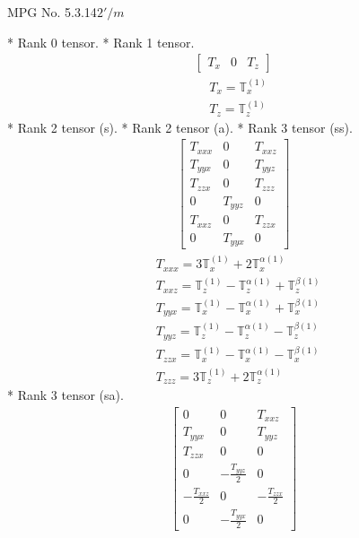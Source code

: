 \documentclass[fleqn,8pt,landscape]{jsarticle}
\begin{document}
\setcounter{MaxMatrixCols}{32}

\renewcommand{\tablename}{Table~}
\renewcommand{\figurename}{Figure~}
\begin{center}
\LARGE
MPG No. 5.3.14\quad$2'/m$
\end{center}
* Rank 0 tensor.
* Rank 1 tensor.
\begin{align*}
\begin{bmatrix} T_{x} & 0 & T_{z} \end{bmatrix}
\end{align*}
\begin{align*}
& T_{x} = \mathbb{T}_{x}^{(1)} \\
& T_{z} = \mathbb{T}_{z}^{(1)}
\end{align*}
* Rank 2 tensor (s).
* Rank 2 tensor (a).
* Rank 3 tensor (ss).
\begin{align*}
\begin{bmatrix} T_{xxx} & 0 & T_{xxz} \\ T_{yyx} & 0 & T_{yyz} \\ T_{zzx} & 0 & T_{zzz} \\ 0 & T_{yyz} & 0 \\ T_{xxz} & 0 & T_{zzx} \\ 0 & T_{yyx} & 0 \end{bmatrix}
\end{align*}
\begin{align*}
& T_{xxx} = 3 \mathbb{T}_{x}^{(1)} + 2 \mathbb{T}_{x}^{\alpha(1)} \\
& T_{xxz} = \mathbb{T}_{z}^{(1)} - \mathbb{T}_{z}^{\alpha(1)} + \mathbb{T}_{z}^{\beta(1)} \\
& T_{yyx} = \mathbb{T}_{x}^{(1)} - \mathbb{T}_{x}^{\alpha(1)} + \mathbb{T}_{x}^{\beta(1)} \\
& T_{yyz} = \mathbb{T}_{z}^{(1)} - \mathbb{T}_{z}^{\alpha(1)} - \mathbb{T}_{z}^{\beta(1)} \\
& T_{zzx} = \mathbb{T}_{x}^{(1)} - \mathbb{T}_{x}^{\alpha(1)} - \mathbb{T}_{x}^{\beta(1)} \\
& T_{zzz} = 3 \mathbb{T}_{z}^{(1)} + 2 \mathbb{T}_{z}^{\alpha(1)}
\end{align*}
* Rank 3 tensor (sa).
\begin{align*}
\begin{bmatrix} 0 & 0 & T_{xxz} \\ T_{yyx} & 0 & T_{yyz} \\ T_{zzx} & 0 & 0 \\ 0 & - \frac{T_{yyz}}{2} & 0 \\ - \frac{T_{xxz}}{2} & 0 & - \frac{T_{zzx}}{2} \\ 0 & - \frac{T_{yyx}}{2} & 0 \end{bmatrix}
\end{align*}
\end{document}
